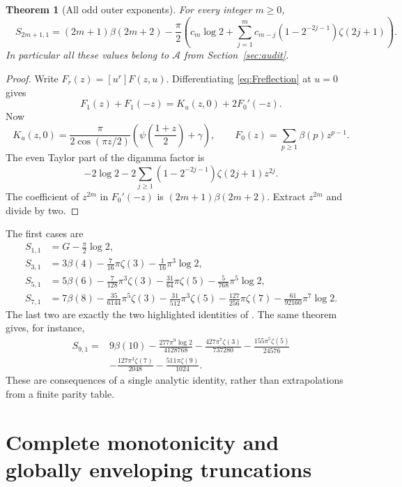 \documentclass[11pt]{article}
\numberwithin{equation}{section}
\newtheorem{theorem}{Theorem}[section]
\theoremstyle{definition}\newtheorem{definition}[theorem]{Definition}
\theoremstyle{remark}\newtheorem{remark}[theorem]{Remark}
\newcommand{\calA}{\mathcal A}
\begin{document}
\begin{theorem}[All odd outer exponents]\label{thm:odd}
For every integer $m\ge0$,
\begin{equation}\label{eq:oddformula}
 \boxed{\quad
 S_{2m+1,1}=(2m+1)\beta(2m+2)
 -\frac\pi2\left(c_m\log2+
 \sum_{j=1}^m c_{m-j}(1-2^{-2j-1})\zeta(2j+1)\right).
 \quad}
\end{equation}
In particular all these values belong to $\calA$ from Section~\ref{sec:audit}.
\end{theorem}
\begin{proof}
Write $F_r(z)=[u^r]F(z,u)$. Differentiating \eqref{eq:Freflection} at $u=0$ gives
\[
 F_1(z)+F_1(-z)=K_u(z,0)+2F_0'(-z).
\]
Now
\[
 K_u(z,0)=\frac{\pi}{2\cos(\pi z/2)}
                  \left(\psi\left(\frac{1+z}{2}\right)+\gamma\right),
 \qquad F_0(z)=\sum_{p\ge1}\beta(p)z^{p-1}.
\]
The even Taylor part of the digamma factor is
\[
 -2\log2-2\sum_{j\ge1}(1-2^{-2j-1})\zeta(2j+1)z^{2j}.
\]
The coefficient of $z^{2m}$ in $F_0'(-z)$ is
$(2m+1)\beta(2m+2)$. Extract $z^{2m}$ and divide by two.
\end{proof}

The first cases are
\begin{align*}
 S_{1,1}&=G-\tfrac\pi2\log2,\\
 S_{3,1}&=3\beta(4)-\tfrac7{16}\pi\zeta(3)-\tfrac1{16}\pi^3\log2,\\
 S_{5,1}&=5\beta(6)-\tfrac7{128}\pi^3\zeta(3)-\tfrac{31}{64}\pi\zeta(5)
                          -\tfrac5{768}\pi^5\log2,\\
 S_{7,1}&=7\beta(8)-\tfrac{35}{6144}\pi^5\zeta(3)
           -\tfrac{31}{512}\pi^3\zeta(5)-\tfrac{127}{256}\pi\zeta(7)
           -\tfrac{61}{92160}\pi^7\log2.
\end{align*}
The last two are exactly the two highlighted identities of \cite{repoGaussian}. The same theorem gives, for instance,
\begin{align*}
 S_{9,1}={}&9\beta(10)-\frac{277\pi^9\log2}{4128768}
 -\frac{427\pi^7\zeta(3)}{737280}-\frac{155\pi^5\zeta(5)}{24576}\\
 &-\frac{127\pi^3\zeta(7)}{2048}-\frac{511\pi\zeta(9)}{1024}.
\end{align*}
These are consequences of a single analytic identity, rather than extrapolations from a finite parity table.

\section{Complete monotonicity and globally enveloping truncations}
\label{sec:envelopes}
\end{document}
